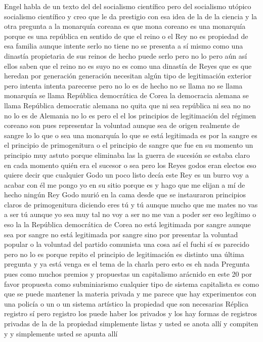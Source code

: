 Engel habla de un texto del del socialismo científico pero del socialismo utópico socialismo científico
y creo que le da prestigio con esa idea de la de la ciencia y la otra pregunta a la monarquía
coreana es que mona coreano es una monarquía porque es una república en sentido de que el reino o el Rey no es propiedad de esa familia
aunque intente serlo no tiene no se presenta a sí mismo como una dinastía propietaria de sus reinos
de hecho puede serlo pero no lo pero aún así ellos saben que el reino no es suyo no es como una dinastía de Reyes
que es que heredan por generación generación necesitan algún tipo de legitimación exterior pero intenta
intenta parecerse pero no lo es de hecho no se llama no se llama monarquía se llama República democrática de Corea
la democracia alemana se llama República democratic alemana no quita que ni sea república ni sea no
no no lo es de Alemania no lo es pero el el los principios de legitimación del régimen coreano son
pues representar la voluntad aunque sea de origen realmente de sangre lo lo que o sea una monarquía
lo que se está legitimada es por la sangre es el principio de primogenitura o el principio de sangre que fue en su momento un principio muy astuto
porque eliminaba las la guerra de sucesión se estaba claro en cada momento quién era el sucesor o sea pero los Reyes godos eran electos
eso quiere decir que cualquier Godo un poco listo decía este Rey es un burro voy a acabar con él me pongo yo en su sitio porque es
y hago que me elijan a mí de hecho ningún Rey Godo murió en la cama desde que se instauraron principios claros
de primogenitura diciendo eres tú y tú aunque mucho que me mates no vas a ser tú
aunque yo sea muy tal no voy a ser no me van a poder ser eso legítimo o eso la la República democrática de Corea
no está legitimada por sangre aunque sea por sangre no está legitimada por sangre sino por presentar la voluntad popular
o la voluntad del partido comunista una cosa así el fuchi sí
es parecido pero no lo es porque repito el principio de legitimación es distinto
una última pregunta y ya está venga es el tema de la charla pero esto es eh nada
Pregunta
pues como muchos premios y propuestas un capitalismo arácnido en este 20 por favor propuesta como subminiarismo
cualquier tipo de sistema capitalista es como que se puede mantener la materia privada
y me parece que hay experimentos con una policía o un o un sistema artístico la propiedad que son necesarias
Réplica
registro sí pero registro los puede haber los privados y los hay formas de registros privadas de la de la propiedad
simplemente listas y usted se anota allí y compiten y y simplemente usted se apunta allí
